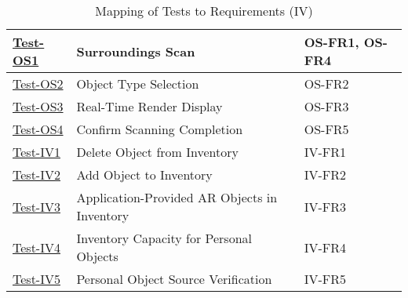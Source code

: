 \documentclass[12pt, titlepage]{article}
\begin{document}
\begin{table}[htpb!]
\begin{tabular}{|l|p{8cm}|p{3cm}|}
    \hline
    \hyperref[itm:Test-OS1]{Test-OS1}       & Surroundings Scan                                                                         & OS-FR1, OS-FR4 \\
    \hline
    \hyperref[itm:Test-OS2]{Test-OS2}       & Object Type Selection                                                                     & OS-FR2         \\
    \hline
    \hyperref[itm:Test-OS3]{Test-OS3}       & Real-Time Render Display                                                                  & OS-FR3         \\
    \hline
    \hyperref[itm:Test-OS4]{Test-OS4}       & Confirm Scanning Completion                                                               & OS-FR5         \\
    \hline
    \hyperref[itm:Test-IV1]{Test-IV1}       & Delete Object from Inventory                                                              & IV-FR1         \\
    \hline
    \hyperref[itm:Test-IV2]{Test-IV2}       & Add Object to Inventory                                                                   & IV-FR2         \\
    \hline
    \hyperref[itm:Test-IV3]{Test-IV3}       & Application-Provided AR Objects in Inventory                                              & IV-FR3         \\
    \hline
    \hyperref[itm:Test-IV4]{Test-IV4}       & Inventory Capacity for Personal Objects                                                   & IV-FR4         \\
    \hline
    \hyperref[itm:Test-IV5]{Test-IV5}       & Personal Object Source Verification                                                       & IV-FR5         \\
    \hline
  \end{tabular}
  \caption{Mapping of Tests to Requirements (IV)}
  \label{tab:test_requirements4}
\end{table}
\end{document}
